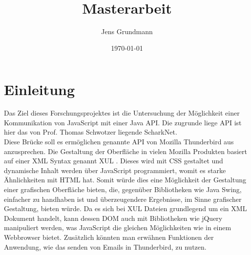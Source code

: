\documentclass[a4paper]{article}
\title{Masterarbeit}
\author{Jens Grundmann}
\date{\today}
\begin{document}
	\begin{titlepage}
		\maketitle	
	\end{titlepage}

\tableofcontents
\newpage

	\section{Einleitung}
	Das Ziel dieses Forschungsprojektes ist die Untersuchung der Möglichkeit einer
	Kommunikation von JavaScript mit einer Java API. Die zugrunde liege API ist hier das 
	von Prof. Thomas Schwotzer liegende ScharkNet. \cite{SharkNet01} \\
	
	Diese Brücke soll es ermöglichen genannte API von Mozilla Thunderbird aus anzusprechen.
	Die Gestaltung der Oberfläche in vielen Mozilla Produkten basiert auf einer XML 
	Syntax genannt XUL \cite{Mozilla01}. Dieses wird mit CSS gestaltet und dynamische 
	Inhalt werden über JavaScript programmiert, womit es starke Ähnlichkeiten mit HTML
	hat. Somit würde dies eine Möglichkeit der Gestaltung einer grafischen Oberfläche 
	bieten, die, gegenüber Bibliotheken wie Java Swing, einfacher zu handhaben ist und
	überzeugendere Ergebnisse, im Sinne grafischer Gestaltung, bieten würde. Da es sich
	bei XUL Dateien grundlegend um ein XML Dokument handelt, kann dessen DOM auch mit Bibliotheken 
	wie jQuery \cite{jQuery01} manipuliert werden, was JavaScript die gleichen Möglichkeiten
	wie in einem Webbrowser bietet. Zusätzlich könnten man erwähnen Funktionen der Anwendung,
	wie das senden von Emails in Thunderbird, zu nutzen.
\end{document}
